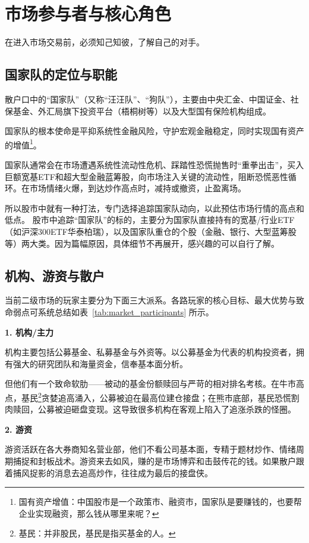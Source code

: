 \documentclass[12pt,openany]{book}
\newcommand{\subhead}[1]{%
    \par\vspace{0.5\baselineskip}%
    \noindent\textbf{#1}\par%
    \vspace{0.5\baselineskip}%
}
\begin{document}
\section{市场参与者与核心角色}

在进入市场交易前，必须知己知彼，了解自己的对手。

\subsection{国家队的定位与职能}

散户口中的“国家队”（又称“汪汪队”、“狗队”），主要由中央汇金、中国证金、社保基金、外汇局旗下投资平台（梧桐树等）以及大型国有保险机构组成。

国家队的根本使命是平抑系统性金融风险，守护宏观金融稳定，同时实现国有资产的增值\footnote{国有资产增值：中国股市是一个政策市、融资市，国家队是要赚钱的，也要帮企业实现融资，那么钱从哪里来呢？}。

国家队通常会在市场遭遇系统性流动性危机、踩踏性恐慌抛售时“重拳出击”，买入巨额宽基ETF和超大型金融蓝筹股，向市场注入关键的流动性，阻断恐慌恶性循环。在市场情绪火爆，到达炒作高点时，减持或撤资，止盈离场。

所以股市中就有一种打法，专门选择追踪国家队动向，以此预估市场行情的高点和低点。
股市中追踪“国家队”的标的，主要分为国家队直接持有的宽基/行业ETF（如沪深300ETF华泰柏瑞），以及国家队重仓的个股（金融、银行、大型蓝筹股等）两大类。因为篇幅原因，具体细节不再展开，感兴趣的可以自行了解。


\subsection{机构、游资与散户}

当前二级市场的玩家主要分为下面三大派系。各路玩家的核心目标、最大优势与致命弱点可系统总结如表~\ref{tab:market_participants} 所示。

\subhead{1. 机构/主力}

机构主要包括公募基金、私募基金与外资等。以公募基金为代表的机构投资者，拥有强大的研究团队和海量资金，信奉基本面分析。

但他们有一个致命软肋——被动的基金份额赎回与严苛的相对排名考核。在牛市高点，基民\footnote{基民：并非股民，基民是指买基金的人。}贪婪追高涌入，公募被迫在最高位建仓接盘；在熊市底部，基民恐慌割肉赎回，公募被迫砸盘变现。这导致很多机构在客观上陷入了追涨杀跌的怪圈。


\subhead{2. 游资}

游资活跃在各大券商知名营业部，他们不看公司基本面，专精于题材炒作、情绪周期捕捉和封板战术。游资来去如风，赚的是市场博弈和击鼓传花的钱。如果散户跟着捕风捉影的消息去追高炒作，往往成为最后的接盘侠。
\end{document}
